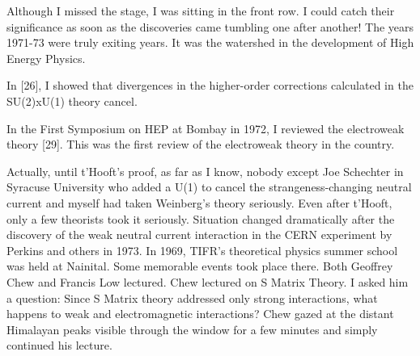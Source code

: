 Although I missed the stage, I was sitting in the front row. I could 
catch their significance as soon as the discoveries came tumbling one 
after another! The years 1971-73 were truly exi\-ting years. It was the 
watershed in the development of High Ene\-rgy Physics.

In [26], I showed that divergences in the higher-order corrections 
calculated in the SU(2)xU(1) theory cancel.

In the First Symposium on HEP at Bombay in 1972, I reviewed the 
electroweak theory [29]. This was the first review of the electroweak 
theory in the country.
 
Actually, until t'Hooft's proof, as far as I know, nobody except Joe 
Schechter in Syracuse University who added a U(1) to cancel the 
strangeness-changing neutral current and myself had taken Weinberg's 
theory seriously. Even after t'Hooft, only a few theorists took it 
seriously. Situation changed dramatically after the discovery of the 
weak neutral current interaction in the CERN experiment by Perkins and 
others in 1973.
\vskip 1pt
In 1969, TIFR's theoretical physics summer school was held at Nainital. 
Some memorable events took place there. Both Geo\-ffrey Chew and Francis 
Low lectured. Chew lectured on S Matrix Theory. I asked him a question: 
Since S Matrix theory addressed only strong interactions, what happens 
to weak and electromagnetic interactions? Chew gazed at the distant 
Himala\-yan peaks visible through the window for a few minutes and simply 
conti\-nued his lecture.

